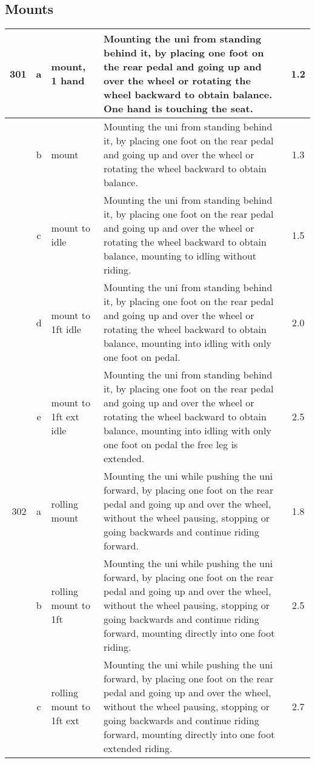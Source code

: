 \subsection{Mounts}
\begin{longtable}{|r|c|p{4cm}|p{8cm}|c|}
\hline
301 & a & mount, 1 hand & Mounting the uni from standing behind it, by placing one foot on the rear pedal and going up and over the wheel or rotating the wheel backward to obtain balance. One hand is touching the seat.  & 1.2 \\ 
\hline
  & b & mount & Mounting the uni from standing behind it, by placing one foot on the rear pedal and going up and over the wheel or rotating the wheel backward to obtain balance. & 1.3 \\ 
\hline
  & c & mount to idle & Mounting the uni from standing behind it, by placing one foot on the rear pedal and going up and over the wheel or rotating the wheel backward to obtain balance, mounting to idling without riding.  & 1.5 \\ 
\hline
  & d & mount to 1ft idle & Mounting the uni from standing behind it, by placing one foot on the rear pedal and going up and over the wheel or rotating the wheel backward to obtain balance, mounting into idling with only one foot on pedal. & 2.0 \\ 
\hline
  & e & mount to 1ft ext idle & Mounting the uni from standing behind it, by placing one foot on the rear pedal and going up and over the wheel or rotating the wheel backward to obtain balance, mounting into idling with only one foot on pedal the free leg is extended.  & 2.5 \\ 
\hline
302 & a & rolling mount & Mounting the uni while pushing the uni forward, by placing one foot on the rear pedal and going up and over the wheel, without the wheel pausing, stopping or going backwards and continue riding forward.  & 1.8 \\ 
\hline
  & b & rolling mount to 1ft  & Mounting the uni while pushing the uni forward, by placing one foot on the rear pedal and going up and over the wheel, without the wheel pausing, stopping or going backwards and continue riding forward, mounting directly into one foot riding.  & 2.5 \\ 
\hline
  & c & rolling mount to 1ft ext  & Mounting the uni while pushing the uni forward, by placing one foot on the rear pedal and going up and over the wheel, without the wheel pausing, stopping or going backwards and continue riding forward, mounting directly into one foot extended riding. & 2.7 \\ 

\end{longtable}

